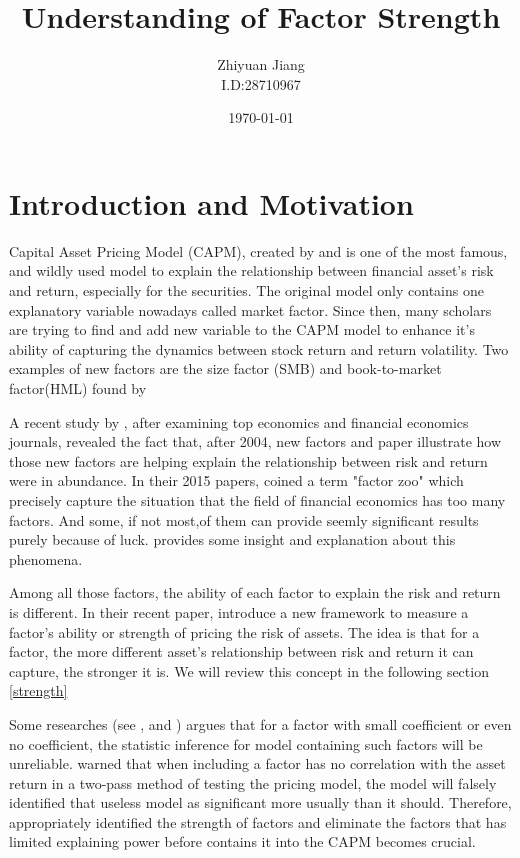 \documentclass[12pt]{article}
\title{Understanding of Factor Strength}
\author{Zhiyuan Jiang\\I.D:28710967}
\date{\today}
\begin{document}
	\maketitle	
	\newpage
	\tableofcontents
	\newpage
	\section{Introduction and Motivation} \label{Intro}
Capital Asset Pricing Model (CAPM), created by  and  is one of the most famous, and wildly used model to explain the relationship between financial asset's risk and return, especially for the securities.  
The original model only contains one explanatory variable nowadays called market factor. 
Since then, many scholars are trying to find and add new variable to the CAPM model to enhance it's ability of capturing the dynamics  between stock return and return volatility. 
Two examples of new factors are the size factor (SMB) and book-to-market factor(HML) found by  

A recent study by , after examining top economics and financial economics journals, revealed the fact that, after 2004, new factors and paper illustrate how those new factors are helping explain the relationship between risk and return were in abundance.
In their 2015 papers, \citeauthor{Harvey2015}  coined a term "factor zoo" which precisely capture the situation that the field of financial economics has too many factors. And some, if not most,of them can provide seemly significant results purely because of luck. 
 provides some insight and explanation about this phenomena.

Among all those factors, the ability of each factor to explain the risk and return is different. 
In their recent paper, \cite{Bailey2020} introduce a new framework to measure a factor's ability or strength of pricing the risk of  assets.
The idea is that for a factor, the more different asset's relationship between risk and return it can capture, the stronger it is.
We will review this concept in the following section \ref{strength}

Some researches (see , and ) argues that for a factor with small coefficient or even no coefficient, the statistic inference for model containing such factors will be unreliable.
 warned that when including a factor has no correlation with the asset return in a two-pass method of testing the pricing model, the model will falsely identified that useless model as significant more usually than it should. 
Therefore, appropriately identified the  strength of factors and eliminate the factors that has limited explaining power before contains it into the CAPM becomes crucial.
\end{document}
